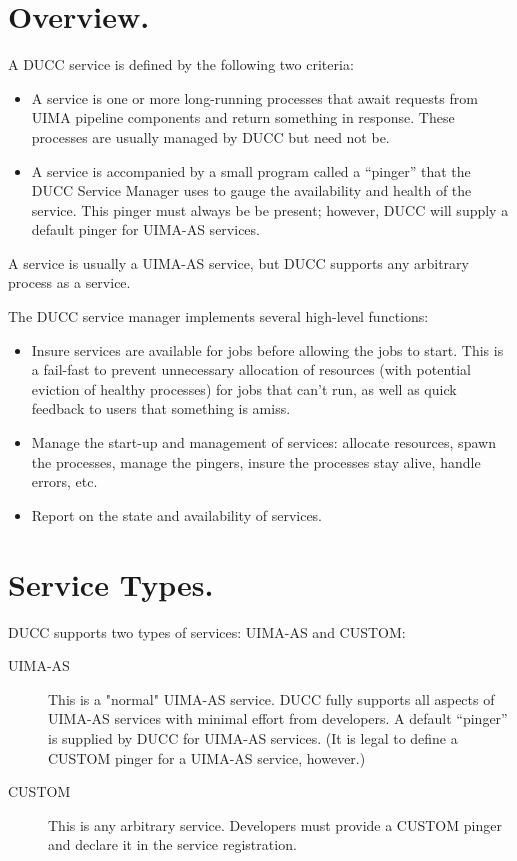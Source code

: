 
      \section{Overview.} 
      A DUCC service is defined by the following two criteria:
      \begin{itemize}
          \item A service is one or more long-running processes that await requests from
            UIMA pipeline components and return something in response.  These processes
            are usually managed by DUCC but need not be.
          \item A service is accompanied by a small program called a ``pinger'' that
            the DUCC Service Manager uses to gauge the availability and health of the
            service.  This pinger must always be be present; however, DUCC will
            supply a default pinger for UIMA-AS services.
      \end{itemize}

      A service is usually a UIMA-AS service, but DUCC supports any arbitrary process
      as a service.

      The DUCC service manager implements several high-level functions:
      
      \begin{itemize}
          \item Insure services are available for jobs before allowing the jobs to start. This is a fail-fast
            to prevent unnecessary allocation of resources (with potential eviction of healthy processes)
            for jobs that can't run, as well as quick feedback to users that something is amiss.
      
          \item Manage the start-up and management of services: allocate resources, spawn the
            processes, manage the pingers, insure the processes stay alive, handle errors, etc.
      
          \item Report on the state and availability of services.
       \end{itemize}


    \section{Service Types.}
    \label{sec:services.types}
      DUCC supports two types of services: UIMA-AS and CUSTOM:
      
      \begin{description}
          \item[UIMA-AS] This is a "normal" UIMA-AS service. DUCC fully supports all aspects of UIMA-AS
            services with minimal effort from developers.  A default ``pinger'' is supplied by DUCC
            for UIMA-AS services.  (It is legal to define a CUSTOM pinger for a UIMA-AS service,
            however.)
            
          \item[CUSTOM] This is any arbitrary service.  Developers must provide a CUSTOM pinger
            and declare it in the service registration.            
      \end{description}

